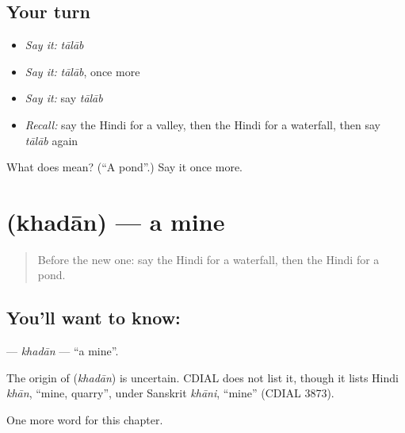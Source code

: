 \subsection*{Your turn}
\begin{itemize}
\raggedright
  \item \emph{Say it:} \emph{tālāb}
  \item \emph{Say it:} \emph{tālāb}, once more
  \item \emph{Say it:} say \emph{tālāb}
  \item \emph{Recall:} say the Hindi for a valley, then the Hindi for a waterfall, then say \emph{tālāb} again
\end{itemize}

\begin{tcolorbox}[breakable,colback=teal!4,colframe=teal!35!black,title={Before you move on}]
What does  mean? (\textquotedblleft{}A pond\textquotedblright{}.) Say it once more.
\end{tcolorbox}
\section[\texorpdfstring{\hi{खदान} (khadān)}{खदान (khadān)}]{ (khadān) — a mine}

\label{lesson:HI-C201-khadan}



\begin{quote}
Before the new one: say the Hindi for a waterfall, then the Hindi for a pond.
\end{quote}

\subsection*{You'll want to know: }
\textbf{} — \emph{khadān} — \textquotedblleft{}a mine\textquotedblright{}.

\begin{cousinweb}
The origin of \textbf{} (\emph{khadān}) is uncertain. CDIAL does not list it, though it lists Hindi \emph{khān}, \textquotedblleft{}mine, quarry\textquotedblright{}, under Sanskrit \emph{khāni}, \textquotedblleft{}mine\textquotedblright{} (CDIAL 3873).
\end{cousinweb}

\begin{grammarlens}[title={What you've built}]
One more word for this chapter.
\end{grammarlens}

